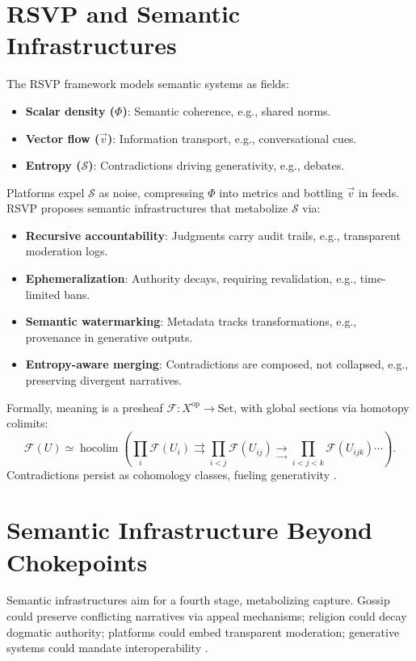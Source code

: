 \documentclass[a4paper,12pt]{article}
\newcommand{\F}{\mathcal{F}}
\newcommand{\Scal}{\mathcal{S}} %
\newcommand{\vvec}{\vec{v}} %
\DeclareMathOperator{\hocolim}{hocolim}
\begin{document}
\section{RSVP and Semantic Infrastructures}
The RSVP framework \citep{semantic2025} models semantic systems as fields:
\begin{itemize}
    \item \textbf{Scalar density ($\Phi$)}: Semantic coherence, e.g., shared norms.
    \item \textbf{Vector flow ($\vvec$)}: Information transport, e.g., conversational cues.
    \item \textbf{Entropy ($\Scal$)}: Contradictions driving generativity, e.g., debates.
\end{itemize}
Platforms expel $\Scal$ as noise, compressing $\Phi$ into metrics and bottling $\vvec$ in feeds. RSVP proposes semantic infrastructures that metabolize $\Scal$ via:
\begin{itemize}
    \item \textbf{Recursive accountability}: Judgments carry audit trails, e.g., transparent moderation logs.
    \item \textbf{Ephemeralization}: Authority decays, requiring revalidation, e.g., time-limited bans.
    \item \textbf{Semantic watermarking}: Metadata tracks transformations, e.g., provenance in generative outputs.
    \item \textbf{Entropy-aware merging}: Contradictions are composed, not collapsed, e.g., preserving divergent narratives.
\end{itemize}
Formally, meaning is a presheaf $\F: X^{\text{op}} \to \mathrm{Set}$, with global sections via homotopy colimits:
\[
\F(U) \simeq \hocolim \left( \prod_i \F(U_i) \rightrightarrows \prod_{i < j} \F(U_{ij}) \underset{\to}{\to} \prod_{i < j < k} \F(U_{ijk}) \cdots \right).
\]
Contradictions persist as cohomology classes, fueling generativity \citep{lurie2009higher}.

\section{Semantic Infrastructure Beyond Chokepoints}
Semantic infrastructures aim for a fourth stage, metabolizing capture. Gossip could preserve conflicting narratives via appeal mechanisms; religion could decay dogmatic authority; platforms could embed transparent moderation; generative systems could mandate interoperability \citep{doctorow2023enshittification}. 
\end{document}
